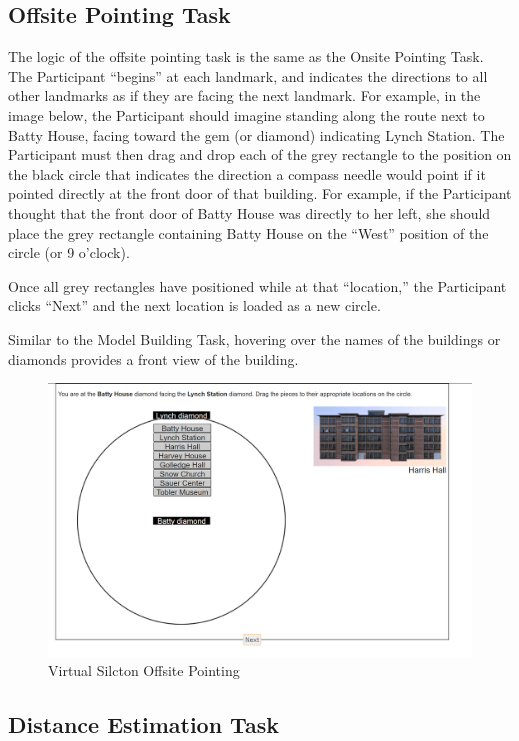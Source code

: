 \documentclass[
  12pt,
]{book}
\begin{document}
\hypertarget{offsite-pointing-task}{%
\subsection{Offsite Pointing Task}\label{offsite-pointing-task}}

The logic of the offsite pointing task is the same as the Onsite Pointing Task. The Participant ``begins'' at each landmark, and indicates the directions to all other landmarks as if they are facing the next landmark. For example, in the image below, the Participant should imagine standing along the route next to Batty House, facing toward the gem (or diamond) indicating Lynch Station. The Participant must then drag and drop each of the grey rectangle to the position on the black circle that indicates the direction a compass needle would point if it pointed directly at the front door of that building. For example, if the Participant thought that the front door of Batty House was directly to her left, she should place the grey rectangle containing Batty House on the ``West'' position of the circle (or 9 o'clock).

Once all grey rectangles have positioned while at that ``location,'' the Participant clicks ``Next'' and the next location is loaded as a new circle.

Similar to the Model Building Task, hovering over the names of the buildings or diamonds provides a front view of the building.

\begin{figure}
\centering
\includegraphics{./figs/Offsite_Pointing.png}
\caption{Virtual Silcton Offsite Pointing}
\end{figure}

\hypertarget{distance-estimation-task}{%
\subsection{Distance Estimation Task}\label{distance-estimation-task}}
\end{document}
